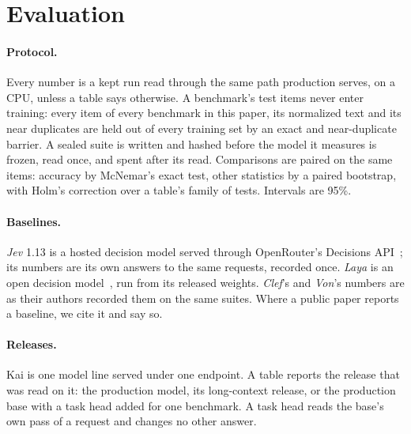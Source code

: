 \section{Evaluation}
\label{sec:evaluation}

\paragraph{Protocol.} Every number is a kept run read through the same path
production serves,  on a CPU, unless a table says otherwise. A
benchmark's test items never enter training: every item of every benchmark in
this paper, its normalized text and its near duplicates are held out of every
training set by an exact and near-duplicate barrier. A sealed suite is written
and hashed before the model it measures is frozen, read once, and spent after
its read. Comparisons are paired on the same items: accuracy by McNemar's exact
test, other statistics by a paired bootstrap, with Holm's correction over a
table's family of tests. Intervals are 95\%.

\paragraph{Baselines.} \emph{Jev} 1.13 is a hosted decision model served
through OpenRouter's Decisions API~\cite{openrouterdecisions}; its numbers are
its own answers to the same requests, recorded once. \emph{Laya} is an open
decision model~\cite{laya}, run from its released weights. \emph{Clef}'s and
\emph{Von}'s numbers are as their authors recorded them on the same suites.
Where a public paper reports a baseline, we cite it and say so.

\paragraph{Releases.} Kai is one model line served under one endpoint. A table
reports the release that was read on it: the production model, its
long-context release, or the production base with a task head added for one
benchmark. A task head reads the base's own pass of a request and changes no
other answer.
